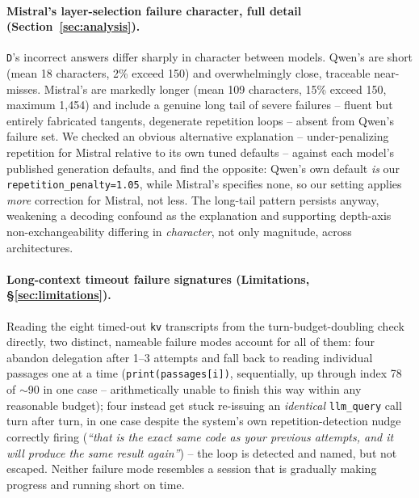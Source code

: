 \documentclass[11pt]{article}
\begin{document}
\paragraph{Mistral's layer-selection failure character, full detail
(Section~\ref{sec:analysis}).} \texttt{D}'s incorrect answers differ
sharply in character between models. Qwen's are short (mean 18
characters, 2\% exceed 150) and overwhelmingly close, traceable
near-misses. Mistral's are markedly longer (mean 109 characters, 15\%
exceed 150, maximum 1,454) and include a genuine long tail of severe
failures -- fluent but entirely fabricated tangents, degenerate
repetition loops -- absent from Qwen's failure set. We checked an obvious
alternative explanation -- under-penalizing repetition for Mistral
relative to its own tuned defaults -- against each model's published
generation defaults, and find the opposite: Qwen's own default
\emph{is} our \texttt{repetition\_penalty=1.05}, while Mistral's
specifies none, so our setting applies \emph{more} correction for
Mistral, not less. The long-tail pattern persists anyway, weakening a
decoding confound as the explanation and supporting depth-axis
non-exchangeability differing in \emph{character}, not only magnitude,
across architectures.

\paragraph{Long-context timeout failure signatures (Limitations, \S\ref{sec:limitations}).}
Reading the eight timed-out \texttt{kv} transcripts from the
turn-budget-doubling check directly, two distinct, nameable failure
modes account for all of them: four abandon delegation after 1--3
attempts and fall back to reading individual passages one at a time
(\texttt{print(passages[i])}, sequentially, up through index 78 of
$\sim$90 in one case -- arithmetically unable to finish this way within
any reasonable budget); four instead get stuck re-issuing an
\emph{identical} \texttt{llm\_query} call turn after turn, in one case
despite the system's own repetition-detection nudge correctly firing
(\textit{``that is the exact same code as your previous attempts, and it
will produce the same result again''}) -- the loop is detected and
named, but not escaped. Neither failure mode resembles a session that is
gradually making progress and running short on time.
\end{document}

